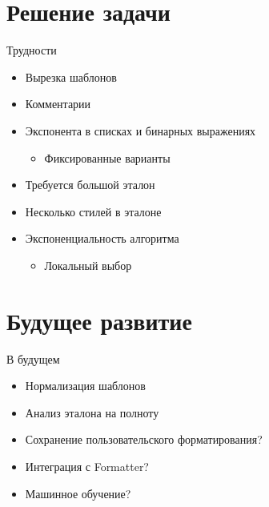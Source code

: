 \documentclass[sans]{beamer}
\begin{document}


\section{Решение задачи}

\begin{frame}{Трудности}
	\begin{itemize}
		\item Вырезка шаблонов
		\item Комментарии
		\item Экспонента в списках и бинарных выражениях
		\begin{itemize}
			\item Фиксированные варианты
		\end{itemize}
	\end{itemize}

	\begin{itemize}
		\item Требуется большой эталон 
		\item Несколько стилей в эталоне
		\item Экспоненциальность алгоритма
		\begin{itemize}
			\item Локальный выбор 
		\end{itemize}
	\end{itemize}
\end{frame}

	

\section{Будущее развитие}

\begin{frame}{В будущем}
	\begin{itemize}
		\item Нормализация шаблонов
		\item Анализ эталона на полноту
		\item Сохранение пользовательского форматирования?
		\item Интеграция с Formatter?
		\item Машинное обучение?
	\end{itemize}
\end{frame}
\end{document}
